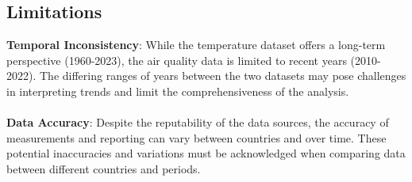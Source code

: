 \documentclass{article}
\begin{document}
\subsection{Limitations}
\textbf{Temporal Inconsistency}: While the temperature dataset offers a long-term perspective (1960-2023), the air quality data is limited to recent years (2010-2022). The differing ranges of years between the two datasets may pose challenges in interpreting trends and limit the comprehensiveness of the analysis.\\\\
\textbf{Data Accuracy}: Despite the reputability of the data sources, the accuracy of measurements and reporting can vary between countries and over time. These potential inaccuracies and variations must be acknowledged when comparing data between different countries and periods.
\end{document}
